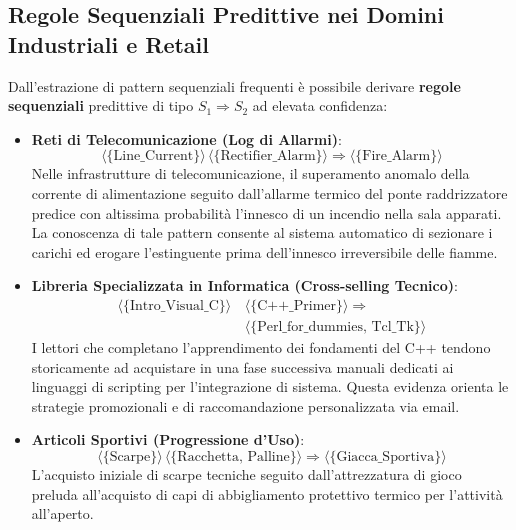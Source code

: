 \subsection{Regole Sequenziali Predittive nei Domini Industriali e Retail}
Dall'estrazione di pattern sequenziali frequenti è possibile derivare \textbf{regole sequenziali} predittive di tipo $S_1 \Longrightarrow S_2$ ad elevata confidenza:
\begin{itemize}
    \item \textbf{Reti di Telecomunicazione (Log di Allarmi)}:
    \begin{equation}
    \langle \{\text{Line\_Current}\} \rangle \, \langle \{\text{Rectifier\_Alarm}\} \rangle \Longrightarrow \langle \{\text{Fire\_Alarm}\} \rangle
    \end{equation}
    Nelle infrastrutture di telecomunicazione, il superamento anomalo della corrente di alimentazione seguito dall'allarme termico del ponte raddrizzatore predice con altissima probabilità l'innesco di un incendio nella sala apparati. La conoscenza di tale pattern consente al sistema automatico di sezionare i carichi ed erogare l'estinguente prima dell'innesco irreversibile delle fiamme.
    
    \item \textbf{Libreria Specializzata in Informatica (Cross-selling Tecnico)}:
    \begin{equation}
    \begin{split}
    \langle \{\text{Intro\_Visual\_C}\} \rangle \, &\langle \{\text{C++\_Primer}\} \rangle \Longrightarrow \\
    &\langle \{\text{Perl\_for\_dummies, Tcl\_Tk}\} \rangle
    \end{split}
    \end{equation}
    I lettori che completano l'apprendimento dei fondamenti del C++ tendono storicamente ad acquistare in una fase successiva manuali dedicati ai linguaggi di scripting per l'integrazione di sistema. Questa evidenza orienta le strategie promozionali e di raccomandazione personalizzata via email.
    
    \item \textbf{Articoli Sportivi (Progressione d'Uso)}:
    \begin{equation}
    \langle \{\text{Scarpe}\} \rangle \, \langle \{\text{Racchetta, Palline}\} \rangle \Longrightarrow \langle \{\text{Giacca\_Sportiva}\} \rangle
    \end{equation}
    L'acquisto iniziale di scarpe tecniche seguito dall'attrezzatura di gioco preluda all'acquisto di capi di abbigliamento protettivo termico per l'attività all'aperto.
\end{itemize}

